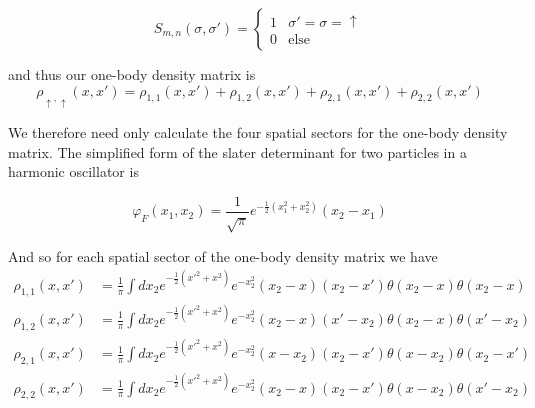\documentclass[onecolumn,english,aps,pra]{revtex4}
\begin{document}
\begin{equation}
S_{m, n}(\sigma, \sigma') = 
\begin{cases}
	1 & \sigma' = \sigma = \uparrow\\
	0 & \text{else}
\end{cases}
\end{equation}

and thus our one-body density matrix is
\begin{equation}
\rho_{\uparrow, \uparrow}(x, x') = 
\rho_{1, 1}(x, x') + \rho_{1, 2}(x, x')
+ \rho_{2, 1}(x, x') + \rho_{2, 2}(x, x')
\end{equation}

We therefore need only calculate the four spatial sectors for the one-body density matrix. The simplified form of the slater determinant for two particles in a harmonic oscillator is

\begin{equation}
\varphi_F(x_1, x_2) = \frac{1}{\sqrt{\pi}} e^{-\frac{1}{2} (x_1^2 + x_2^2) } (x_2 - x_1)
\end{equation}

And so for each spatial sector of the one-body density matrix we have
\begin{align*}
\rho_{1, 1}(x, x') &= \frac{1}{\pi} \int dx_2 e^{-\frac{1}{2} (x'^2 + x^{2}) } 
 e^{-x_2^2} (x_2 - x)(x_2 - x') \theta(x_2 - x) \theta(x_2 - x)\\
\rho_{1, 2}(x, x') &= \frac{1}{\pi} \int dx_2 
e^{-\frac{1}{2} (x'^2 + x^2) } e^{-x_2^2} (x_2 - x)(x' - x_2) 
\theta(x_2 - x) \theta(x' - x_2)\\
\rho_{2, 1}(x, x') &= \frac{1}{\pi} \int dx_2 
e^{-\frac{1}{2} (x'^2 + x^2) } e^{-x_2^2} (x - x_2)(x_2 - x') 
\theta(x - x_2) \theta(x_2 - x')\\
\rho_{2,2}(x, x') &= \frac{1}{\pi} \int dx_2 e^{-\frac{1}{2} (x'^2 + x^2) } 
e^{-x_2^2} (x_2 - x)(x_2 - x') \theta(x - x_2) \theta(x' - x_2)
\end{align*}
\end{document}
